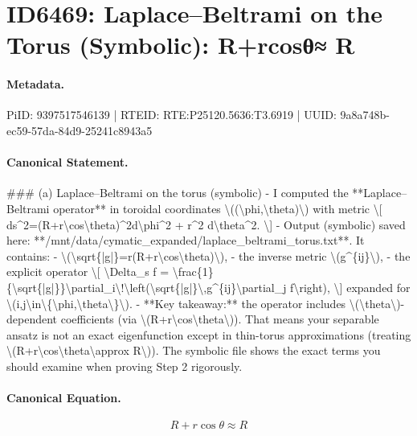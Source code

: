 \section*{ID6469: Laplace–Beltrami on the Torus (Symbolic): R+rcosθ≈ R}
\paragraph{Metadata.}
PiID: 9397517546139 | RTEID: RTE:P25120.5636:T3.6919 | UUID: 9a8a748b-ec59-57da-84d9-25241c8943a5

\paragraph{Canonical Statement.}
\#\#\# (a) Laplace–Beltrami on the torus (symbolic) - I computed the **Laplace–Beltrami operator** in toroidal coordinates \textbackslash{}((\textbackslash{}phi,\textbackslash{}theta)\textbackslash{}) with metric \textbackslash{}[ ds\textasciicircum{}2=(R+r\textbackslash{}cos\textbackslash{}theta)\textasciicircum{}2d\textbackslash{}phi\textasciicircum{}2 + r\textasciicircum{}2 d\textbackslash{}theta\textasciicircum{}2. \textbackslash{}] - Output (symbolic) saved here: **/mnt/data/cymatic\_expanded/laplace\_beltrami\_torus.txt**. It contains: - \textbackslash{}(\textbackslash{}sqrt\{|g|\}=r(R+r\textbackslash{}cos\textbackslash{}theta)\textbackslash{}), - the inverse metric \textbackslash{}(g\textasciicircum{}\{ij\}\textbackslash{}), - the explicit operator \textbackslash{}[ \textbackslash{}Delta\_s f = \textbackslash{}frac\{1\}\{\textbackslash{}sqrt\{|g|\}\}\textbackslash{}partial\_i\textbackslash{}!\textbackslash{}left(\textbackslash{}sqrt\{|g|\}\textbackslash{},g\textasciicircum{}\{ij\}\textbackslash{}partial\_j f\textbackslash{}right), \textbackslash{}] expanded for \textbackslash{}(i,j\textbackslash{}in\textbackslash{}\{\textbackslash{}phi,\textbackslash{}theta\textbackslash{}\}\textbackslash{}). - **Key takeaway:** the operator includes \textbackslash{}(\textbackslash{}theta\textbackslash{})-dependent coefficients (via \textbackslash{}(R+r\textbackslash{}cos\textbackslash{}theta\textbackslash{})). That means your separable ansatz is not an exact eigenfunction except in thin-torus approximations (treating \textbackslash{}(R+r\textbackslash{}cos\textbackslash{}theta\textbackslash{}approx R\textbackslash{})). The symbolic file shows the exact terms you should examine when proving Step 2 rigorously.

\paragraph{Canonical Equation.}
\[
R+r\cos\theta\approx R
\]

